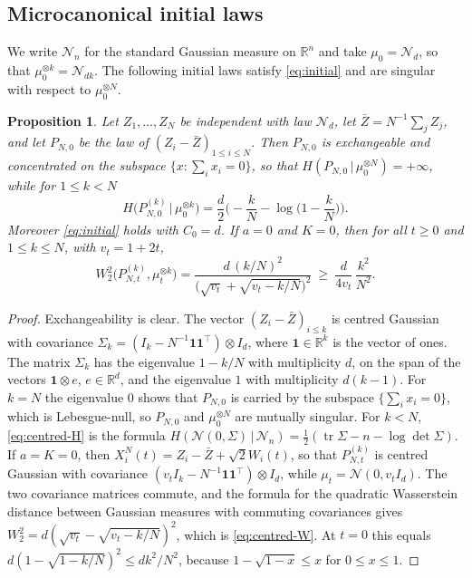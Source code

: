 \documentclass[11pt]{amsart}
\numberwithin{equation}{section}
\theoremstyle{plain}
\newtheorem{proposition}[theorem]{Proposition}
\theoremstyle{remark}
\newcommand{\R}{\mathbb{R}}
\newcommand{\cN}{\mathcal{N}}
\newcommand{\W}{W_2}
\newcommand{\one}{\mathbf 1}
\begin{document}
\subsection{Microcanonical initial laws}\label{sec:examples}
We write $\cN_n$ for the standard Gaussian measure on $\R^n$ and take $\mu_0=\cN_d$, so that $\mu_0^{\otimes k}=\cN_{dk}$. The following initial laws satisfy \eqref{eq:initial} and are singular with respect to $\mu_0^{\otimes N}$.

\begin{proposition}\label{prop:centred}
Let $Z_1,\dots,Z_N$ be independent with law $\cN_d$, let $\bar Z=N^{-1}\sum_jZ_j$, and let $P_{N,0}$ be the law of $(Z_i-\bar Z)_{1\le i\le N}$. Then $P_{N,0}$ is exchangeable and concentrated on the subspace $\{x:\sum_ix_i=0\}$, so that $H(P_{N,0}\,|\,\mu_0^{\otimes N})=+\infty$, while for $1\le k<N$
\begin{equation}\label{eq:centred-H}
H\big(P^{(k)}_{N,0}\,\big|\,\mu_0^{\otimes k}\big)=\frac d2\Big(-\frac kN-\log\Big(1-\frac kN\Big)\Big).
\end{equation}
Moreover \eqref{eq:initial} holds with $C_0=d$. If $a=0$ and $K=0$, then for all $t\ge0$ and $1\le k\le N$, with $v_t=1+2t$,
\begin{equation}\label{eq:centred-W}
\W^2\big(P^{(k)}_{N,t},\mu_t^{\otimes k}\big)=\frac{d\,(k/N)^2}{\big(\sqrt{v_t}+\sqrt{v_t-k/N}\big)^2}\ \ge\ \frac{d}{4v_t}\,\frac{k^2}{N^2}.
\end{equation}
\end{proposition}

\begin{proof}
Exchangeability is clear. The vector $(Z_i-\bar Z)_{i\le k}$ is centred Gaussian with covariance $\Sigma_k=(I_k-N^{-1}\one\one^{\top})\otimes I_d$, where $\one\in\R^k$ is the vector of ones. The matrix $\Sigma_k$ has the eigenvalue $1-k/N$ with multiplicity $d$, on the span of the vectors $\one\otimes e$, $e\in\R^d$, and the eigenvalue $1$ with multiplicity $d(k-1)$. For $k=N$ the eigenvalue $0$ shows that $P_{N,0}$ is carried by the subspace $\{\sum_ix_i=0\}$, which is Lebesgue-null, so $P_{N,0}$ and $\mu_0^{\otimes N}$ are mutually singular. For $k<N$, \eqref{eq:centred-H} is the formula $H(\cN(0,\Sigma)\,|\,\cN_n)=\frac12(\operatorname{tr}\Sigma-n-\log\det\Sigma)$. If $a=K=0$, then $X^N_i(t)=Z_i-\bar Z+\sqrt2W_i(t)$, so that $P^{(k)}_{N,t}$ is centred Gaussian with covariance $(v_tI_k-N^{-1}\one\one^{\top})\otimes I_d$, while $\mu_t=\cN(0,v_tI_d)$. The two covariance matrices commute, and the formula for the quadratic Wasserstein distance between Gaussian measures with commuting covariances \cite{DL82,GS84} gives $\W^2=d(\sqrt{v_t}-\sqrt{v_t-k/N})^2$, which is \eqref{eq:centred-W}. At $t=0$ this equals $d(1-\sqrt{1-k/N})^2\le dk^2/N^2$, because $1-\sqrt{1-x}\le x$ for $0\le x\le1$.
\end{proof}
\end{document}
